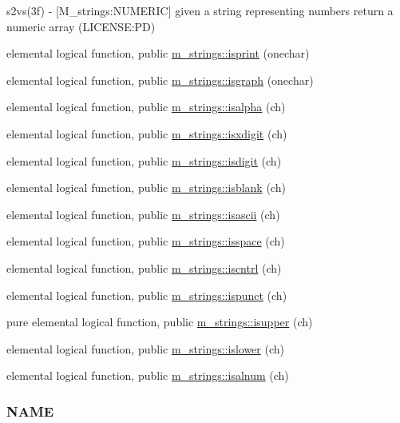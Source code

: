 \begin{DoxyCompactItemize}
\begin{DoxyCompactList}
s2vs(3f) -\/ \mbox{[}M\+\_\+strings\+:N\+U\+M\+E\+R\+IC\mbox{]} given a string representing numbers return a numeric array (L\+I\+C\+E\+N\+SE\+:PD) \end{DoxyCompactList}\item 
elemental logical function, public \mbox{\hyperlink{namespacem__strings_a267f2fde729a75496c82a64754a91e54}{m\+\_\+strings\+::isprint}} (onechar)
\item 
elemental logical function, public \mbox{\hyperlink{namespacem__strings_a84c80fdeeba0679488ed8ad8d37e53c5}{m\+\_\+strings\+::isgraph}} (onechar)
\item 
elemental logical function, public \mbox{\hyperlink{namespacem__strings_a5cf6d7fbd1b3ea17e37c6213c6ba0fdb}{m\+\_\+strings\+::isalpha}} (ch)
\item 
elemental logical function, public \mbox{\hyperlink{namespacem__strings_a9953d1e400bedceab6a06910c6cdf208}{m\+\_\+strings\+::isxdigit}} (ch)
\item 
elemental logical function, public \mbox{\hyperlink{namespacem__strings_a9f5f98a6c93e21618a16d98a5de2debc}{m\+\_\+strings\+::isdigit}} (ch)
\item 
elemental logical function, public \mbox{\hyperlink{namespacem__strings_aebb074d3971c0b93e39d1cfaa45658d8}{m\+\_\+strings\+::isblank}} (ch)
\item 
elemental logical function, public \mbox{\hyperlink{namespacem__strings_afb63e9fefbc04e4e9a2ec4df4334078c}{m\+\_\+strings\+::isascii}} (ch)
\item 
elemental logical function, public \mbox{\hyperlink{namespacem__strings_ab32380c29451e56395153155c1632d74}{m\+\_\+strings\+::isspace}} (ch)
\item 
elemental logical function, public \mbox{\hyperlink{namespacem__strings_a4821cb5a5c4024c9dc6dd159300034ca}{m\+\_\+strings\+::iscntrl}} (ch)
\item 
elemental logical function, public \mbox{\hyperlink{namespacem__strings_a8712164e1f5fd717bdea854a3f067619}{m\+\_\+strings\+::ispunct}} (ch)
\item 
pure elemental logical function, public \mbox{\hyperlink{namespacem__strings_ac98536a1b69026cd5373dfff489f7733}{m\+\_\+strings\+::isupper}} (ch)
\item 
elemental logical function, public \mbox{\hyperlink{namespacem__strings_a9de5290748f02f575f3b7b859ff074ed}{m\+\_\+strings\+::islower}} (ch)
\item 
elemental logical function, public \mbox{\hyperlink{namespacem__strings_ad8fd9bbf618bdba2c3ac9fb3c8174362}{m\+\_\+strings\+::isalnum}} (ch)
\begin{DoxyCompactList}\small\item\em \subsubsection*{N\+A\+ME}


\end{DoxyCompactList}
\end{DoxyCompactItemize}
